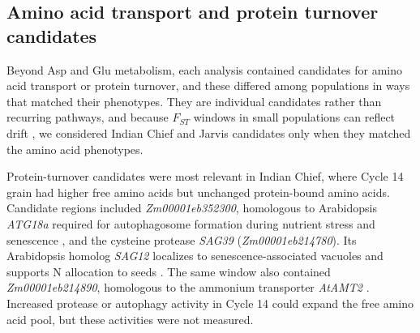 \subsection{Amino acid transport and protein turnover candidates}

Beyond Asp and Glu metabolism, each analysis contained candidates for amino acid transport or protein turnover, and these differed among populations in ways that matched their phenotypes. They are individual candidates rather than recurring pathways, and because $F_{ST}$ windows in small populations can reflect drift \citep{Gerke2015DriftRRS}, we considered Indian Chief and Jarvis candidates only when they matched the amino acid phenotypes.

Protein-turnover candidates were most relevant in Indian Chief, where Cycle 14 grain had higher free amino acids but unchanged protein-bound amino acids. Candidate regions included \textit{Zm00001eb352300}, homologous to Arabidopsis \textit{ATG18a} required for autophagosome formation during nutrient stress and senescence \citep{Xiong2005ATG18a}, and the cysteine protease \textit{SAG39} (\textit{Zm00001eb214780}). Its Arabidopsis homolog \textit{SAG12} localizes to senescence-associated vacuoles \citep{Otegui2005SAV} and supports N allocation to seeds \citep{James2018SAG12}. The same window also contained \textit{Zm00001eb214890}, homologous to the ammonium transporter \textit{AtAMT2} \citep{Neuhaeuser2009AtAMT2}. Increased protease or autophagy activity in Cycle 14 could expand the free amino acid pool, but these activities were not measured.

